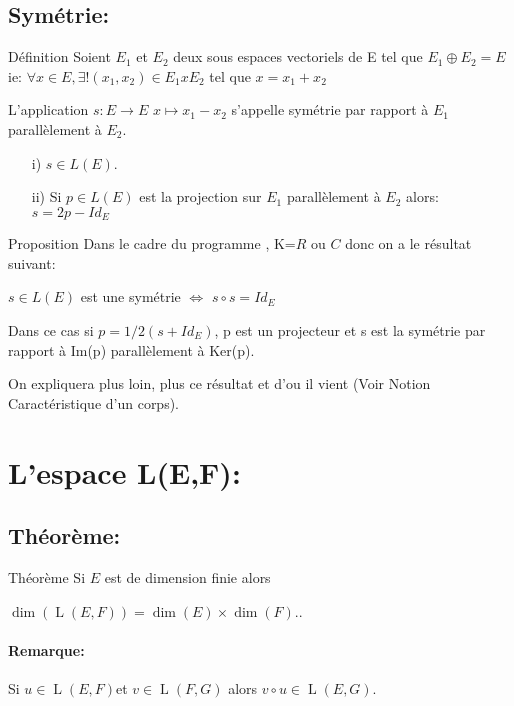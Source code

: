\documentclass{book}
\begin{document}
\subsection{Symétrie:}
\begin{Définition}[]{Définition}{}
    Soient $E_{1}$ et $E_{2}$ deux sous espaces vectoriels de E tel que ${\displaystyle E_{1} \oplus E_{2}=E}$ ie:
${\displaystyle \forall x \in E, \exists! (x_{1}, x_{2}) \in E_{1} {x} E_{2}}$ tel que ${\displaystyle x=x_{1}+x_{2}}$

L'application ${\displaystyle  s:E\to E}$
${x\mapsto x_{1} - x_{2}}$ s'appelle symétrie par rapport à $E_{1}$ parallèlement à $E_{2}$.
\begin{itemize}
    \item[i)] ${\displaystyle s \in L(E)}$.
    \item[ii)] Si ${\displaystyle p \in L(E)}$ est la projection sur $E_{1}$ parallèlement à $E_{2}$ alors: 
${\displaystyle  s=2p-Id_{E}}$
\end{itemize}
\end{Définition}
\begin{Propriété}[]{Proposition}{}
Dans le cadre du programme , K=$R$ ou $C$ donc on a le résultat suivant:

$s \in L(E)$ est une symétrie $\Leftrightarrow$ $s \circ s=Id_{E}$

Dans ce cas si $p=1/2(s+Id_{E})$, p est un projecteur et s est la symétrie par rapport à Im(p) parallèlement à Ker(p).

On expliquera plus loin, plus ce résultat et d'ou il vient (Voir Notion Caractéristique d'un corps).
\end{Propriété}
\section{L'espace L(E,F):}
\subsection{Théorème: }
\begin{Théorème}[]{Théorème}{}
Si ${\displaystyle E}$ est de dimension finie alors

${\displaystyle \dim \left(\operatorname {L} (E,F)\right)=\dim(E)\times \dim(F).}$.
\end{Théorème}
\paragraph{Remarque: }
Si ${\displaystyle u\in \operatorname {L} (E,F)}$et ${\displaystyle v\in \operatorname {L} (F,G)}$ alors ${\displaystyle v\circ u\in \operatorname {L} (E,G)}$.
\end{document}

